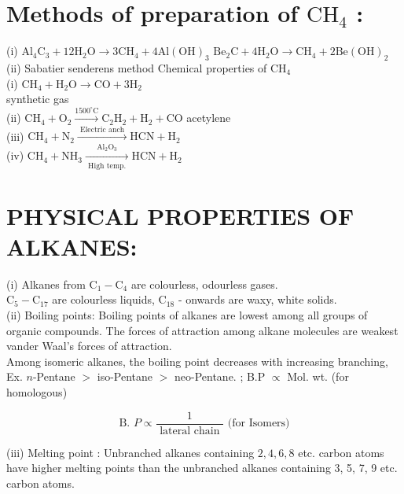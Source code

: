 \documentclass[10pt]{article}
\begin{document}
\section*{Methods of preparation of $\mathrm{CH}_{4}$ :}
(i) $\mathrm{Al}_{4} \mathrm{C}_{3}+12 \mathrm{H}_{2} \mathrm{O} \longrightarrow 3 \mathrm{CH}_{4}+4 \mathrm{Al}(\mathrm{OH})_{3}$ $\mathrm{Be}_{2} \mathrm{C}+4 \mathrm{H}_{2} \mathrm{O} \longrightarrow \mathrm{CH}_{4}+2 \mathrm{Be}(\mathrm{OH})_{2}$\\
(ii) Sabatier senderens method Chemical properties of $\mathrm{CH}_{4}$\\
(i) $\mathrm{CH}_{4}+\mathrm{H}_{2} \mathrm{O} \longrightarrow \mathrm{CO}+3 \mathrm{H}_{2}$\\
synthetic gas\\
(ii) $\mathrm{CH}_{4}+\mathrm{O}_{2} \xrightarrow{1500^{\circ} \mathrm{C}} \mathrm{C}_{2} \mathrm{H}_{2}+\mathrm{H}_{2}+\mathrm{CO}$ acetylene\\
(iii) $\mathrm{CH}_{4}+\mathrm{N}_{2} \xrightarrow{\text { Electric anch }} \mathrm{HCN}+\mathrm{H}_{2}$\\
(iv) $\mathrm{CH}_{4}+\mathrm{NH}_{3} \xrightarrow[\text { High temp. }]{\mathrm{Al}_{2} \mathrm{O}_{3}} \mathrm{HCN}+\mathrm{H}_{2}$

\section*{PHYSICAL PROPERTIES OF ALKANES:}
(i) Alkanes from $\mathrm{C}_{1}-\mathrm{C}_{4}$ are colourless, odourless gases.\\
$\mathrm{C}_{5}-\mathrm{C}_{17}$ are colourless liquids, $\mathrm{C}_{18}$ - onwards are waxy, white solids.\\
(ii) Boiling points: Boiling points of alkanes are lowest among all groups of organic compounds. The forces of attraction among alkane molecules are weakest vander Waal's forces of attraction.\\
Among isomeric alkanes, the boiling point decreases with increasing branching,\\
Ex. $n$-Pentane $>$ iso-Pentane $>$ neo-Pentane. ; B.P $\propto$ Mol. wt. (for homologous)

$$
\text { B. } P \propto \frac{1}{\text { lateral chain }} \text { (for Isomers) }
$$

(iii) Melting point : Unbranched alkanes containing $2,4,6,8$ etc. carbon atoms have higher melting points than the unbranched alkanes containing 3, 5, 7, 9 etc. carbon atoms.
\end{document}
